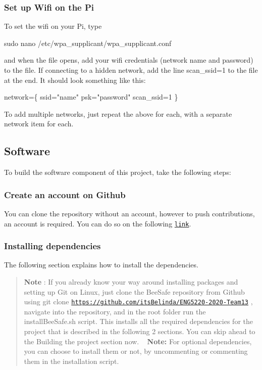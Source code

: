 \subsubsection*{Set up Wifi on the Pi}

To set the wifi on your Pi, type 
\begin{DoxyCode}
sudo nano /etc/wpa\_supplicant/wpa\_supplicant.conf
\end{DoxyCode}
 and when the file opens, add your wifi credentials (network name and password) to the file. If connecting to a hidden network, add the line {\ttfamily scan\+\_\+ssid=1} to the file at the end. It should look something like this\+: 
\begin{DoxyCode}
network=\{
    ssid="name"
    psk="password"
    scan\_ssid=1
\}
\end{DoxyCode}
 To add multiple networks, just repeat the above for each, with a separate network item for each.

\subsection*{Software}

To build the software component of this project, take the following steps\+:

\subsubsection*{Create an account on Github}

You can clone the repository without an account, however to push contributions, an account is required. You can do so on the following \href{https://github.com/join}{\tt link}. ~\newline


\subsubsection*{Installing dependencies}

The following section explains how to install the dependencies. \begin{quote}
{\bfseries Note} \+: If you already know your way around installing packages and setting up Git on Linux, just clone the Bee\+Safe repository from Github using {\ttfamily git clone \href{https://github.com/itsBelinda/ENG5220-2020-Team13}{\tt https\+://github.\+com/its\+Belinda/\+E\+N\+G5220-\/2020-\/\+Team13}} , navigate into the repository, and in the root folder run the {\ttfamily install\+Bee\+Safe.\+sh} script. This installs all the required dependencies for the project that is described in the following 2 sections. You can skip ahead to the {\ttfamily Building the project} section now. ~\newline
 {\bfseries Note\+:} For optional dependencies, you can choose to install them or not, by uncommenting or commenting them in the installation script. \end{quote}


